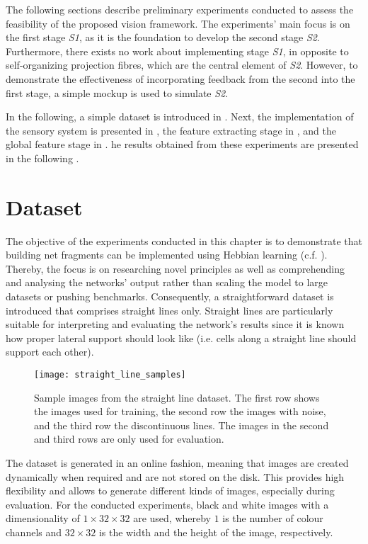 The following sections describe preliminary experiments conducted to assess the feasibility of the proposed vision framework.
The experiments' main focus is on the first stage \emph{S1}, as it is the foundation to develop the second stage \emph{S2}. Furthermore, there exists no work about implementing stage \emph{S1}, in opposite to self-organizing projection fibres, which are the central element of \emph{S2}.
However, to demonstrate the effectiveness of incorporating feedback from the second into the first stage, a simple mockup is used to simulate \emph{S2}.

In the following, a simple dataset is introduced in . Next, the implementation of the sensory system is presented in , the feature extracting stage in , and the global feature stage in . he results obtained from these experiments are presented in the following .


\section{Dataset}
The objective of the experiments conducted in this chapter is to demonstrate that building net fragments can be implemented using Hebbian learning  (c.f. ).
Thereby, the focus is on researching novel principles as well as comprehending and analysing the networks' output rather than scaling the model to large datasets or pushing benchmarks.
Consequently, a straightforward dataset is introduced that comprises straight lines only.
Straight lines are particularly suitable for interpreting and evaluating the network's results since it is known how proper lateral support should look like (i.e. cells along a straight line should support each other).


\begin{figure}[h]
    \centering
    \texttt{[image: straight\_line\_samples]}
    \caption[Sample images from the dataset]{Sample images from the straight line dataset. The first row shows the images used for training, the second row the images with noise, and the third row the discontinuous lines. The images in the second and third rows are only used for evaluation.}
\end{figure}


The dataset is generated in an online fashion, meaning that images are created dynamically when required and are not stored on the disk. This provides high flexibility and allows to generate different kinds of images, especially during evaluation.
For the conducted experiments, black and white images with a dimensionality of $1 \times 32 \times 32$ are used, whereby $1$ is the number of colour channels and $32 \times 32$ is the width and the height of the image, respectively.


